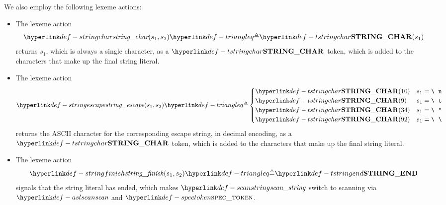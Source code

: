 \begin{mathpar}
\end{mathpar}

\begin{mathpar}
\end{mathpar}

We also employ the following lexeme actions:
\begin{itemize}
\item
\hypertarget{def-stringchar}{}
The lexeme action
\[
\stringchar(s_1, s_2) \triangleq \Tstringchar(s_1)
\]
returns $s_1$, which is always a single character, as a $\Tstringchar$
token, which is added to the characters that make up the final string
literal.

\item
\hypertarget{def-stringescape}{}
The lexeme action
\[
\stringescape(s_1, s_2) \triangleq \begin{cases}
  \Tstringchar(10) & s_1 = \texttt{\textbackslash\;\;n}\\
  \Tstringchar(9) & s_1 = \texttt{\textbackslash\;\;t}\\
  \Tstringchar(34) & s_1 = \texttt{\textbackslash\;\;"}\\
  \Tstringchar(92) & s_1 = \texttt{\textbackslash\;\;\textbackslash}\\
\end{cases}
\]
returns the ASCII character for the corresponding escape string, in decimal encoding,
as a $\Tstringchar$ token, which is added to the characters that make up the final string
literal.

\item
\hypertarget{def-stringfinish}{}
The lexeme action
\[
\stringfinish(s_1, s_2) \triangleq \Tstringend
\]
signals that the string literal has ended, which makes $\scanstring$
switch to scanning via $\aslscan$ and $\spectoken$.
\end{itemize}

